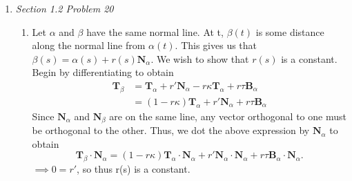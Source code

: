 \documentclass{article}
\begin{document}
\begin{enumerate}
\begin{enumerate}
\end{enumerate}

\item \textit{Section 1.2 Problem 20}\\

\begin{enumerate}

\item Let $\alpha$ and $\beta$ have the same normal line.
At t, $\beta(t)$ is some distance along the normal line from $\alpha(t)$. 
This gives us that $\beta(s) = \alpha(s) +r(s)\mathbf{N}_{\alpha}$.
We wish to show that $r(s)$ is a constant.
Begin by differentiating to obtain
\begin{align*}
\mathbf{T}_{\beta} &= \mathbf{T}_{\alpha} + r'\mathbf{N}_{\alpha} - r\kappa\mathbf{T}_{\alpha} + r\tau\mathbf{B}_{\alpha}\\
&= (1-r\kappa)\mathbf{T}_{\alpha} + r'\mathbf{N}_{\alpha} + r\tau\mathbf{B}_{\alpha}
\end{align*}
Since $\mathbf{N}_{\alpha}$ and $\mathbf{N}_{\beta}$ are on the same line, any vector orthogonal to one must be orthogonal to the other.
Thus, we dot the above expression by $\mathbf{N}_{\alpha}$ to obtain
\begin{equation*}
\mathbf{T}_{\beta}\cdot\mathbf{N}_{\alpha} = (1-r\kappa)\mathbf{T}_{\alpha}\cdot\mathbf{N}_{\alpha} + r'\mathbf{N}_{\alpha}\cdot\mathbf{N}_{\alpha} + r\tau\mathbf{B}_{\alpha}\cdot\mathbf{N}_{\alpha}.
\end{equation*}
$\implies 0 = r'$, so thus r(s) is a constant.


\end{enumerate}
\end{enumerate}
\end{document}
